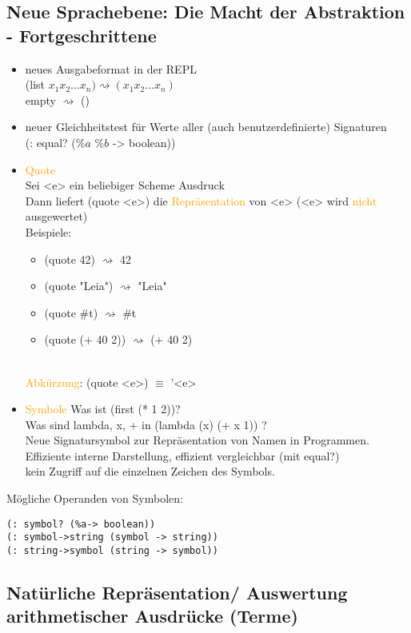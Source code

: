 \documentclass[paper=a4, fontsize=11pt]{scrartcl}
\numberwithin{equation}{section}
\numberwithin{figure}{section}
\numberwithin{table}{section}
\begin{document}
\begin{lstlistig}
\section{Neue Sprachebene: Die Macht der Abstraktion - Fortgeschrittene}
\begin{itemize}
\item neues Ausgabeformat in der REPL \\
(list $x_{1} x_{2} ... x_{n}) \rightsquigarrow (x_{1} x_{2} ... x_{n})$ \\
empty $\rightsquigarrow$ ()
\item neuer Gleichheitstest für Werte aller (auch benutzerdefinierte) Signaturen \\
(: equal? ($\%a$ $\%b$ -> boolean))
\item \textcolor{orange}{Quote} \\
Sei <e> ein beliebiger Scheme Ausdruck \\
Dann liefert (quote <e>) die \textcolor{orange}{Repräsentation} von <e> (<e> wird \textcolor{orange}{nicht} ausgewertet) \\
Beispiele: \begin{itemize}
\item (quote 42) $\rightsquigarrow$ 42
\item (quote "Leia") $\rightsquigarrow$ "Leia"
\item (quote #t) $\rightsquigarrow$ #t
\item (quote (+ 40 2)) $\rightsquigarrow$ (+ 40 2)
\end{itemize} \\
\textcolor{orange}{Abkürzung}: (quote <e>) $\equiv$ '<e>
\item \textcolor{orange}{Symbole}
Was ist (first (* 1 2))? \\
Was sind lambda, x, + in (lambda (x) (+ x 1)) ? \\
Neue Signatursymbol zur Repräsentation von Namen in Programmen. Effiziente interne Darstellung, effizient vergleichbar (mit equal?) \\
kein Zugriff auf die einzelnen Zeichen des Symbols.
\end{itemize}
Mögliche Operanden von Symbolen:
\begin{lstlisting}
(: symbol? (%a-> boolean))
(: symbol->string (symbol -> string))
(: string->symbol (string -> symbol))
\end{lstlisting}
\subsection{Natürliche Repräsentation/ Auswertung arithmetischer Ausdrücke (Terme)}


\end{lstlistig}
\end{document}
